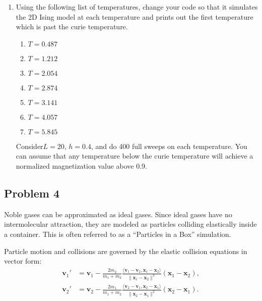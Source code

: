 \documentclass[12pt]{article}
\begin{document}
\begin{enumerate}
    \item Using the following list of temperatures, change your code so that it simulates the 2D Ising model at each temperature and prints out the first temperature which is past the curie temperature.
    \begin{enumerate}
        \item $	T=0.487$
        \item $	T=1.212$
        \item $	T=2.054$
        \item $	T=2.874$
        \item $	T=3.141$
        \item $	T=4.057$
        \item $	T=5.845$
    \end{enumerate}
    Consider$ L=20$, $h=0.4$, and do 400 full sweeps on each temperature. You can assume that any temperature below the curie temperature will achieve a normalized magnetization value above 0.9.
\end{enumerate}

\newpage
\subsection{Problem 4}
Noble gases can be approximated as ideal gases. Since ideal gases have no intermolecular attraction, they are modeled as particles colliding elastically inside a container. This is often referred to as a “Particles in a Box” simulation.

Particle motion and collisions are governed by the elastic collision equations in vector form:
\begin{align}
\mathbf{v}_1' &= \mathbf{v}_1 - \frac{2m_2}{m_1 + m_2} \frac{\langle \mathbf{v}_1 - \mathbf{v}_2, \mathbf{x}_1 - \mathbf{x}_2 \rangle}{\|\mathbf{x}_1 - \mathbf{x}_2\|^2} (\mathbf{x}_1 - \mathbf{x}_2), \\
\mathbf{v}_2' &= \mathbf{v}_2 - \frac{2m_1}{m_1 + m_2} \frac{\langle \mathbf{v}_2 - \mathbf{v}_1, \mathbf{x}_2 - \mathbf{x}_1 \rangle}{\|\mathbf{x}_2 - \mathbf{x}_1\|^2} (\mathbf{x}_2 - \mathbf{x}_1).
\end{align}
\end{document}
